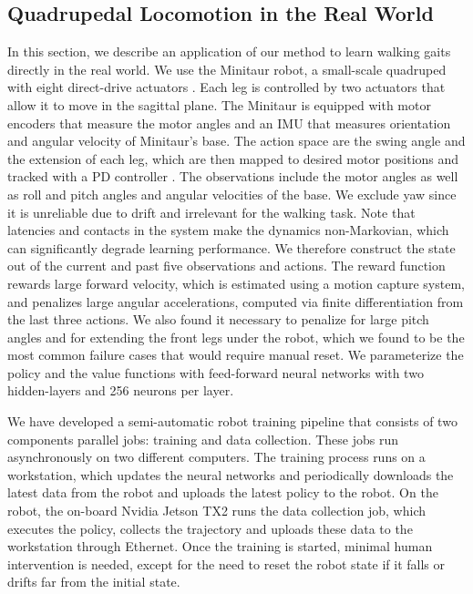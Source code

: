 %
%
%
%
%
%

\subsection{Quadrupedal Locomotion in the Real World}
\label{sec:minitaur}

In this section, we describe an application of our method to learn walking gaits directly in the real world. We use the Minitaur robot, a small-scale quadruped with eight direct-drive actuators \cite{kenneally2016design}. Each leg is controlled by two actuators that allow it to move in the sagittal plane. The Minitaur is equipped with motor encoders that measure the motor angles and an IMU that measures orientation and angular velocity of Minitaur's base. The action space are the swing angle and the extension of each leg, which are then mapped to desired motor positions and tracked with  a PD controller \cite{tan2018sim}. The observations include the motor angles as well as roll and pitch angles and angular velocities of the base. We exclude yaw since it is unreliable due to drift and irrelevant for the walking task. Note that latencies and contacts in the system make the dynamics non-Markovian, which can significantly degrade learning performance. We therefore construct the state out of the current and past five observations and actions. The reward function  rewards large forward velocity, which is estimated using a motion capture system, and penalizes large angular accelerations, computed via finite differentiation from the last three actions. We also found it necessary to penalize for large pitch angles and for extending the front legs under the robot, which we found to be the most common failure cases that would require manual reset. We parameterize the policy and the value functions with feed-forward neural networks with two hidden-layers and 256 neurons per layer.

We have developed a semi-automatic robot training pipeline 
%
that consists of two components parallel jobs: training and data collection. These jobs run asynchronously on two different computers. The training process runs on a workstation, which updates the neural networks and periodically downloads the latest data from the robot and uploads the latest policy to the robot. On the robot, the on-board Nvidia Jetson TX2 runs the data collection job, which executes the policy, collects the trajectory and uploads these data to the workstation through Ethernet. Once the training is started, minimal human intervention is needed, except for the need to reset the robot state if it falls or drifts far from the initial state.

